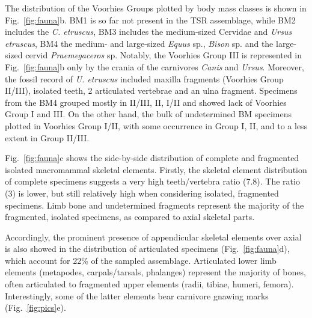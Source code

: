 \documentclass[review,times,authoryear]{elsarticle} %
\begin{document}
The distribution of the Voorhies Groups plotted by body mass classes is shown in Fig.~\ref{fig:fauna}b. BM1 is so far not present in the TSR assemblage, while BM2 includes the \emph{C. etruscus}, BM3 includes the medium-sized Cervidae and \emph{Ursus etruscus}, BM4 the medium- and large-sized \emph{Equus} sp., \emph{Bison} sp. and the large-sized cervid \emph{Praemegaceros} sp. Notably, the Voorhies Group III is represented in Fig.~\ref{fig:fauna}b only by the crania of the carnivores \emph{Canis} and \emph{Ursus}. Moreover, the fossil record of \emph{U. etruscus} included maxilla fragments (Voorhies Group II/III), isolated teeth, 2 articulated vertebrae and an ulna fragment. Specimens from the BM4 grouped mostly in II/III, II, I/II and showed lack of Voorhies Group I and III. On the other hand, the bulk of undetermined BM specimens plotted in Voorhies Group I/II, with some occurrence in Group I, II, and to a less extent in Group II/III.

Fig.~\ref{fig:fauna}c shows the side-by-side distribution of complete and fragmented isolated macromammal skeletal elements. Firstly, the skeletal element distribution of complete specimens suggests a very high teeth/vertebra ratio (7.8). The ratio (3) is lower, but still relatively high when considering isolated, fragmented specimens. Limb bone and undetermined fragments represent the majority of the fragmented, isolated specimens, as compared to axial skeletal parts.

Accordingly, the prominent presence of appendicular skeletal elements over axial is also showed in the distribution of articulated specimens (Fig.~\ref{fig:fauna}d), which account for 22\% of the sampled assemblage. Articulated lower limb elements (metapodes, carpals/tarsals, phalanges) represent the majority of bones, often articulated to fragmented upper elements (radii, tibiae, humeri, femora). Interestingly, some of the latter elements bear carnivore gnawing marks (Fig.~\ref{fig:pics}e).
\end{document}
